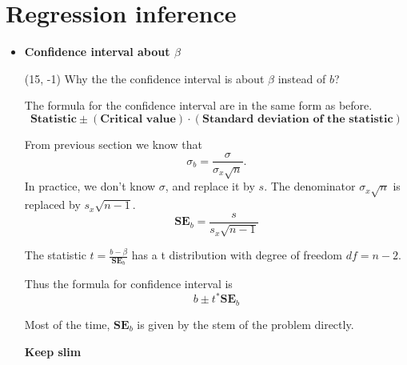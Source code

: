 \documentclass[a4paper, 12pt,twoside]{book}
\begin{document}
\section{Regression inference}
   \begin{itemize}
    \item \textbf{Confidence interval about $\beta$}\vspace{0.3cm}
  \begin{textblock}{3.6}(15, -1)
  Why the the confidence interval is about $\beta$ instead of $b$?
  \end{textblock}
  
  The formula for the confidence interval  are in the same form as before.
  $$\textbf{Statistic}\pm (\textbf{Critical value})\cdot(\textbf{Standard deviation of the statistic})$$    
 
   
   From previous section we know that 
   $$\sigma_b = \frac{\sigma}{\sigma_x \sqrt{n}}.$$
   In practice, we don't know $\sigma$, and replace it by $s$. The denominator $\sigma_x\sqrt{n}$ is replaced by $s_x\sqrt{n-1}$.
   $$\textbf{SE}_b = \frac{s}{s_x\sqrt{n-1}}$$
   \vspace{0.3cm}
   
   The statistic
   $\displaystyle{t=\frac{b-\beta}{\textbf{SE}_b}}$
   has a t distribution with degree of freedom $df=n-2$.\vspace{0.3cm}
   
   Thus the formula for confidence interval is 
   $$b\pm t^* \textbf{SE}_b$$
   
   \colorbox{babypink}{\parbox{\textwidth}{
  Most of the time, $\textbf{SE}_b$ is given by the stem of the problem directly.
   }}
   
   \newpage
   \hspace{-1cm}
 \colorbox{champagne}{\parbox{\textwidth}{
 \textbf{Keep slim}\vspace{0.3cm}
 
}}
\end{itemize}
\end{document}
